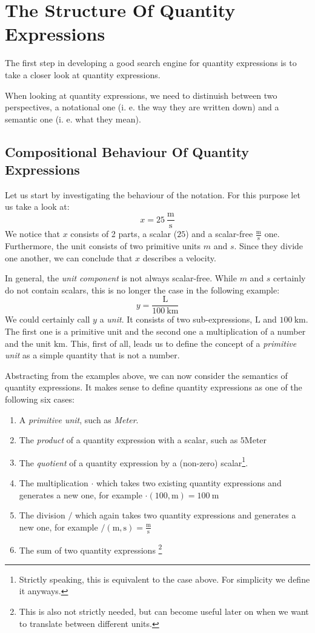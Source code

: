 \section{The Structure Of Quantity Expressions}
\label{sec:strucqe}

The first step in developing a good search engine for quantity expressions is to take a closer look at quantity expressions.

When looking at quantity expressions, we need to distinuish between two perspectives, a notational one (i. e. the way they are written down) and a semantic one (i. e. what they mean).

\subsection{Compositional Behaviour Of Quantity Expressions}
Let us start by investigating the behaviour of the notation. For this purpose let us take a look at:
\[x = 25\ \frac{\text{m}}{\text{s}}\]
We notice that $x$ consists of 2 parts, a scalar ($25$) and a scalar-free $\frac{\text{m}}{\text{s}}$ one. Furthermore, the unit consists of two primitive units $m$ and $s$. Since they divide one another, we can conclude that $x$ describes a velocity.

In general, the \textit{unit component} is not always scalar-free. While $m$ and $s$ certainly do not contain scalars, this is no longer the case in the following example:
\[y = \frac{\text{L}}{100\ \text{km}}\]
We could certainly call $y$ a \textit{unit}. It consists of two sub-expressions, $\text{L}$ and $100\ \text{km}$. The first one is a primitive unit and the second one a multiplication of a number and the unit $\text{km}$. This, first of all, leads us to define the concept of a \textit{primitive unit} as a simple quantity that is not a number.

Abstracting from the examples above, we can now consider the semantics of quantity expressions. It makes sense to define quantity expressions as one of the following six cases:
\begin{enumerate}
  \item A \textit{primitive unit}, such as \textit{Meter}.
  \item The \textit{product} of a quantity expression with a scalar, such as $5 \text{Meter}$
  \item The \textit{quotient} of a quantity expression by a (non-zero) scalar\footnote{Strictly speaking, this is equivalent to the case above. For simplicity we define it anyways. }.
  \item The multiplication $\cdot{}$ which takes two existing quantity expressions and generates a new one, for example $\cdot \left(100, \text{m} \right) = 100\ \text{m}$
  \item The division $/$ which again takes two quantity expressions and generates a new one, for example $\text{/} (\text{m}, \text{s}) = \frac{\text{m}}{\text{s}}$
  \item The sum of two quantity expressions \footnote{This is also not strictly needed, but can become useful later on when we want to translate between different units. }
\end{enumerate}

